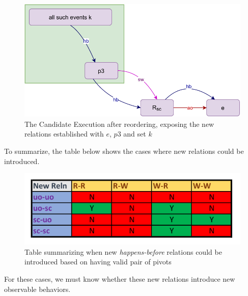     \begin{figure}[H]
        \centering
        \includegraphics[scale=0.7]{InstructionReordering/ValidReorderingProof/ProofParts/Part2/part2(d).pdf}
        \caption{The Candidate Execution after reordering, exposing the new relations established with $e$, $p3$ and set $k$}
        \label{fig:my_label}
    \end{figure}



    To summarize, the table below shows the cases where new relations could be introduced. 
    \begin{figure}[H]
        \centering
        \includegraphics[scale=0.7]{InstructionReordering/ValidReorderingProof/ProofParts/Part2/part2_table.pdf}
        \caption{Table summarizing when new \textit{happens-before} relations could be introduced based on having valid pair of pivots }
        \label{fig:my_label}
    \end{figure}

    For these cases, we must know whether these new relations introduce new observable behaviors. 
